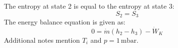 The entropy at state 2 is equal to the entropy at state 3:  
\[
S_2 = S_3
\]  
The energy balance equation is given as:  
\[
0 = \dot{m}(h_2 - h_3) - \dot{W}_K
\]  
Additional notes mention \(T_i\) and \(p = 1 \, \text{mbar}\).